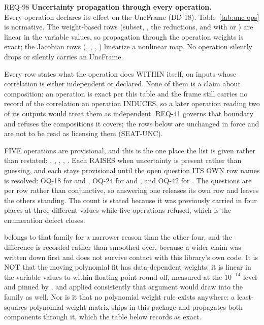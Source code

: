 \begin{reqbox}{REQ-98}{\stable}
\textbf{Uncertainty propagation through every operation.}\\
Every operation declares its effect on the UncFrame (DD-18).
Table~\ref{tab:unc-ops} is normative. The weight-based rows (subset,
, the reductions, and  with
 or ) are linear in the
variable values, so propagation through the operation weights is exact;
the Jacobian rows (, ,
, ) linearize a nonlinear map. No operation
silently drops or silently carries an UncFrame.

Every row states what the operation does WITHIN itself, on inputs whose
correlation is either independent or declared. None of them is a claim
about composition: an operation is exact per this table and the frame
still carries no record of the correlation an operation INDUCES, so a
later operation reading two of its outputs would treat them as
independent. REQ-41 governs that boundary and refuses the compositions
it covers; the rows below are unchanged in force and are not to be read
as licensing them (SEAT-UNC).

FIVE operations are provisional, and this is the one place the list is
given rather than restated: , ,
, , . Each
RAISES when uncertainty is present rather
than guessing, and each stays provisional until the open question ITS
OWN row names is resolved: OQ-18 for  and ,
OQ-24 for  and , and OQ-42 for
. The questions are per row rather than
conjunctive, so answering one releases its own row and leaves the others
standing. The count is stated because it was previously carried in
four places at three different values while five operations refused,
which is the enumeration defect  closes.

 belongs to that family for a narrower
reason than the other four, and the difference is recorded rather than
smoothed over, because a wider claim was written down first and does
not survive contact with this library's own code. It is NOT that the
moving polynomial fit has data-dependent weights: it is linear in the
variable values to within floating-point round-off, measured at the
$10^{-14}$ level and pinned by , and
applied consistently
that argument would draw  into the family as well. Nor
is it that no polynomial weight rule exists anywhere: a least-squares
polynomial weight matrix ships in this package and
 propagates both components
through it, which the table below records as exact.


\end{reqbox}
